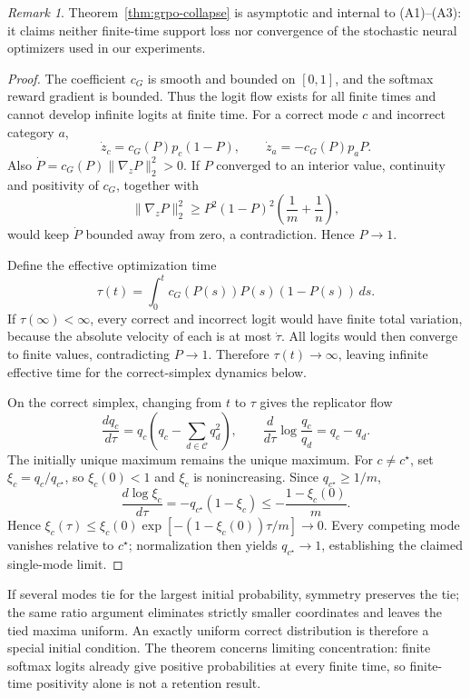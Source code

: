 \documentclass{article}
\newcommand{\enforcehalffinalproseline}{%
  \setlength{\parfillskip}{0pt plus .20\linewidth}}
\newcommand{\1}{\mathbf 1}
\theoremstyle{remark}
\newtheorem{remark}[lemma]{Remark}
\theoremstyle{definition}
\theoremstyle{plain}
\begin{document}
\begin{remark}
Theorem~\ref{thm:grpo-collapse} is asymptotic and internal to (A1)--(A3): it
claims neither finite-time support loss nor convergence of the stochastic
neural optimizers used in our experiments.
\end{remark}

\begin{proof}
\enforcehalffinalproseline
The coefficient $c_G$ is smooth and bounded on $[0,1]$, and the softmax
reward gradient is bounded. Thus the logit flow exists for all finite times
and cannot develop infinite logits at finite time.
For a correct mode $c$ and incorrect category $a$,
\[
  \dot z_c=c_G(P)p_c(1-P),
  \qquad
  \dot z_a=-c_G(P)p_aP.
\]
Also $\dot P=c_G(P)\lVert\nabla_zP\rVert_2^2>0$. If $P$ converged to an
interior value, continuity and positivity of $c_G$, together with
\[
 \lVert\nabla_zP\rVert_2^2
 \ge P^2(1-P)^2\left(\frac1m+\frac1n\right),
\]
would keep $\dot P$ bounded away from zero, a contradiction. Hence $P\to1$.

Define the effective optimization time
\[
  \tau(t)=\int_0^t c_G(P(s))P(s)(1-P(s))\,ds.
\]
If $\tau(\infty)<\infty$, every correct and incorrect logit would have finite
total variation, because the absolute velocity of each is at most $\dot\tau$.
All logits would then converge to finite values, contradicting $P\to1$.
Therefore $\tau(t)\to\infty$, leaving infinite effective time for the
correct-simplex dynamics below.

On the correct simplex, changing from $t$ to $\tau$ gives the replicator flow
\begin{equation}
  \frac{dq_c}{d\tau}
  =q_c\left(q_c-\sum_{d\in\mathcal C}q_d^2\right),
  \qquad
  \frac{d}{d\tau}\log\frac{q_c}{q_d}=q_c-q_d.
  \label{eq:grpo-replicator}
\end{equation}
The initially unique maximum remains the unique maximum. For $c\ne c^\star$,
set $\xi_c=q_c/q_{c^\star}$, so $\xi_c(0)<1$ and $\xi_c$ is nonincreasing.
Since $q_{c^\star}\ge1/m$,
\[
 \frac{d\log\xi_c}{d\tau}
 =-q_{c^\star}(1-\xi_c)
 \le-\frac{1-\xi_c(0)}{m}.
\]
Hence $\xi_c(\tau)\le\xi_c(0)\exp[-(1-\xi_c(0))\tau/m]\to0$.
Every competing mode vanishes relative to $c^\star$; normalization then
yields $q_{c^\star}\to1$, establishing the claimed single-mode limit.
\end{proof}

If several modes tie for the largest initial probability, symmetry preserves
the tie; the same ratio argument eliminates strictly smaller coordinates and
leaves the tied maxima uniform. An exactly uniform correct distribution is
therefore a special initial condition. The theorem concerns limiting
concentration: finite softmax logits already give positive probabilities at
every finite time, so finite-time positivity alone is not a retention result.
\end{document}
